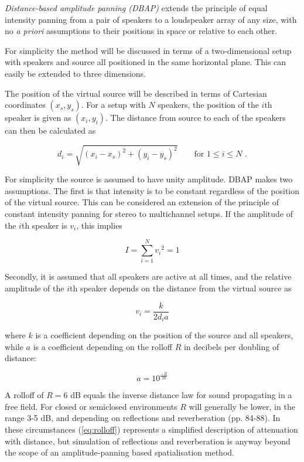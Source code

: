 \documentclass[twoside,10pt]{article}
\begin{document}
\textit{Distance-based amplitude panning (DBAP)} extends the principle of equal intensity panning from a pair of speakers to a loudspeaker array of any size, with no \textit{a priori} assumptions to their positions in space or relative to each other.

For simplicity the method will be discussed in terms of a two-dimensional setup with speakers and source all positioned in the same horizontal plane. This can easily be extended to three dimensions.

The position of the virtual source will be described in terms of Cartesian coordinates $(x_{s}, y_{s})$. For a setup with $N$ speakers, the position of the $i$th speaker is given as $(x_{i}, y_{i})$. The distance from source to each of the speakers can then be calculated as

\begin{equation} \label{eq:distance}
d_{i} = \sqrt{ {(x_{i} - x_{s})}^2 + {(y_{i} - y_{s})}^2 } \qquad \textrm{for } 1 \leq i \leq N \textrm{ .}
\end{equation}

For simplicity the source is assumed to have unity amplitude. DBAP makes two assumptions. The first is that intensity is to be constant regardless of the position of the virtual source. This can be considered an extension of the principle of constant intensity panning for stereo to multichannel setups. If the amplitude of the $i$th speaker is $v_{i}$, this implies

\begin{equation} \label{eq:constant_intensity}
I = \sum_{i=1}^{N} {v_{i}}^2 = 1
\end{equation}

Secondly, it is assumed that all speakers are active at all times, and the relative amplitude of the $i$th speaker depends on the distance from the virtual source as 

\begin{equation} \label{eq:inverse_distance}
v_{i} = \frac{k}{2 d_{i} a} 
\end{equation}

where $k$ is a coefficient depending on the position of the source and all speakers, while $a$ is a coefficient depending on the rolloff $R$ in decibels per doubling of distance:

\begin{equation} \label{eq:rolloff}
	a = 10^{\frac{-R}{20}}
\end{equation}

A rolloff of $R = 6$ dB equals the inverse distance law for sound propagating in a free field. For closed or semiclosed environments $R$ will generally be lower, in the range 3-5 dB, and depending on reflections and reverberation \cite{Everest:2000handbook_acoustics} (pp. 84-88). In these circumstances (\ref{eq:rolloff}) represents a simplified description of attenuation with distance, but simulation of reflections and reverberation is anyway beyond the scope of an amplitude-panning based spatialisation method.
\end{document}
